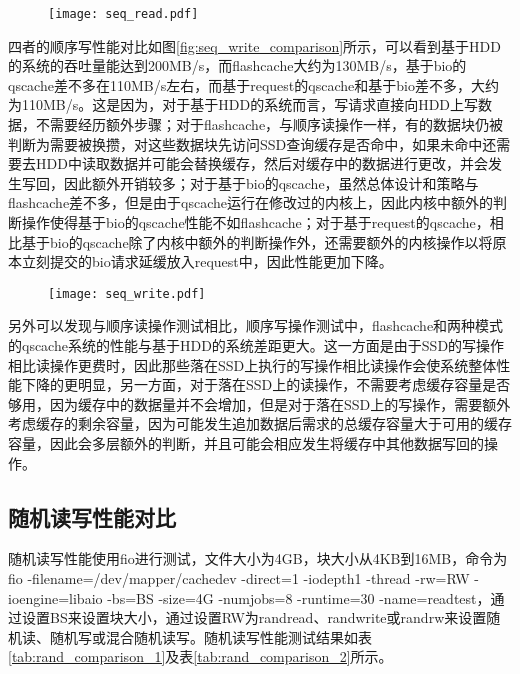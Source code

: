 \begin{figure}[H]
    \centering
    \texttt{[image: seq\_read.pdf]}
\end{figure}

四者的顺序写性能对比如图\ref{fig:seq_write_comparison}所示，可以看到基于HDD的系统的吞吐量能达到200MB/s，而flashcache大约为130MB/s，基于bio的qscache差不多在110MB/s左右，而基于request的qscache和基于bio差不多，大约为110MB/s。这是因为，对于基于HDD的系统而言，写请求直接向HDD上写数据，不需要经历额外步骤；对于flashcache，与顺序读操作一样，有的数据块仍被判断为需要被换攒，对这些数据块先访问SSD查询缓存是否命中，如果未命中还需要去HDD中读取数据并可能会替换缓存，然后对缓存中的数据进行更改，并会发生写回，因此额外开销较多；对于基于bio的qscache，虽然总体设计和策略与flashcache差不多，但是由于qscache运行在修改过的内核上，因此内核中额外的判断操作使得基于bio的qscache性能不如flashcache；对于基于request的qscache，相比基于bio的qscache除了内核中额外的判断操作外，还需要额外的内核操作以将原本立刻提交的bio请求延缓放入request中，因此性能更加下降。

\begin{figure}[H]
    \centering
    \texttt{[image: seq\_write.pdf]}
\end{figure}

另外可以发现与顺序读操作测试相比，顺序写操作测试中，flashcache和两种模式的qscache系统的性能与基于HDD的系统差距更大。这一方面是由于SSD的写操作相比读操作更费时，因此那些落在SSD上执行的写操作相比读操作会使系统整体性能下降的更明显，另一方面，对于落在SSD上的读操作，不需要考虑缓存容量是否够用，因为缓存中的数据量并不会增加，但是对于落在SSD上的写操作，需要额外考虑缓存的剩余容量，因为可能发生追加数据后需求的总缓存容量大于可用的缓存容量，因此会多层额外的判断，并且可能会相应发生将缓存中其他数据写回的操作。

\subsection{随机读写性能对比}

随机读写性能使用fio进行测试，文件大小为4GB，块大小从4KB到16MB，命令为fio -filename=/dev/mapper/cachedev -direct=1 -iodepth1 -thread -rw=RW -ioengine=libaio -bs=BS -size=4G -numjobs=8 -runtime=30 -name=readtest，通过设置BS来设置块大小，通过设置RW为randread、randwrite或randrw来设置随机读、随机写或混合随机读写。随机读写性能测试结果如表\ref{tab:rand_comparison_1}及表\ref{tab:rand_comparison_2}所示。

